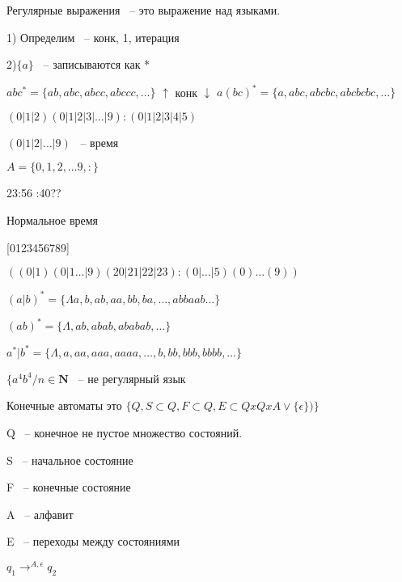 \documentclass[russian]{lecture-notes}
\begin{document}
	\begin{definition}

		Регулярные выражения ~-- это выражение над языками.

		\end{definition}

	1) Определим ~-- конк, 1, итерация

	2)$\{a\} $ ~-- записываются как *

	\begin{example}

		$abc^{*} = \{ ab,abc,abcc,abccc,\dots \}$
		$\uparrow$
		конк
		$\downarrow$
		$a(bc)^{*} = \{ a,abc,abcbc,abcbcbc,\dots\}$

		$(0|1|2)(0|1|2|3|\dots|9):(0|1|2|3|4|5)$

		$(0|1|2|\dots|9)$ ~-- время
		\end{example}

	$A = \{ 0,1,2,\dots 9,:\}$

	23:56 :40??

	Нормальное время

	[0123456789]

	$((0|1)(0|1\dots|9)(20|21|22|23):(0|\dots|5)(0)\dots(9))$

	\begin{example}

	$(a|b)^{*} = \{ \Lambda a,b,ab,aa,bb,ba,\dots,abbaab\dots \}$

		$(ab)^{*} = \{ \Lambda, ab,abab,ababab,\dots \}$

		$a^{*}|b^{*} = \{ \Lambda,a,aa,aaa,aaaa,\dots,b,bb,bbb,bbbb,\dots \}$

		\end{example}

	$\{a^{4}b^{4}/n \in \mathbf{N}$ ~-- не регулярный язык

	\begin{definition}

		Конечные автоматы это $\{ Q,S \subset Q, F \subset Q, E \subset Q x Q x A \lor \{\epsilon\}) \}$

		Q ~-- конечное не пустое множество состояний.

		S ~-- начальное состояние

		F ~-- конечные состояние

		A ~-- алфавит

		E ~-- переходы между состояниями

		$q_{1} \rightarrow^{A,\epsilon } q_{2}$

		\end{definition}
		
\end{document}
